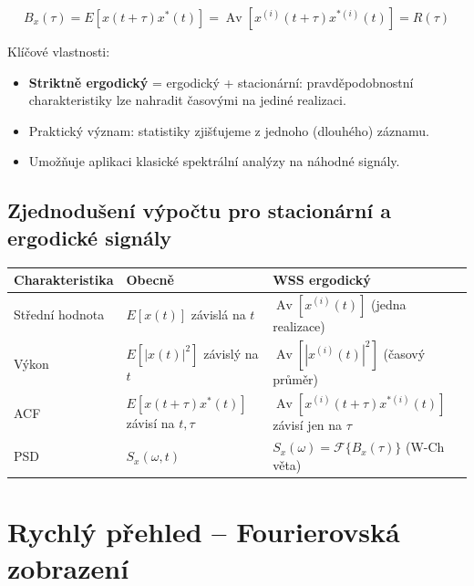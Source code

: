 \documentclass[12pt,a4paper]{article}
\newcommand{\FT}{\mathcal{F}}
\newcommand{\Av}{\operatorname{Av}}
\begin{document}
\begin{matBox}
\[
  B_x(\tau) = E[x(t+\tau)x^*(t)] = \Av[x^{(i)}(t+\tau)x^{*(i)}(t)] = R(\tau)
\]
\end{matBox}

Klíčové vlastnosti:
\begin{itemize}
  \item \textbf{Striktně ergodický} = ergodický + stacionární: pravděpodobnostní charakteristiky lze nahradit časovými na jediné realizaci.
  \item Praktický význam: statistiky zjišťujeme z jednoho (dlouhého) záznamu.
  \item Umožňuje aplikaci klasické spektrální analýzy na náhodné signály.
\end{itemize}

\subsection*{Zjednodušení výpočtu pro stacionární a ergodické signály}

\begin{center}
\begin{tabular}{lll}
\toprule
\textbf{Charakteristika} & \textbf{Obecně} & \textbf{WSS ergodický} \\
\midrule
Střední hodnota & $E[x(t)]$ závislá na $t$ & $\Av[x^{(i)}(t)]$ (jedna realizace) \\
Výkon & $E[|x(t)|^2]$ závislý na $t$ & $\Av[|x^{(i)}(t)|^2]$ (časový průměr) \\
ACF & $E[x(t+\tau)x^*(t)]$ závisí na $t,\tau$ & $\Av[x^{(i)}(t+\tau)x^{*(i)}(t)]$ závisí jen na $\tau$ \\
PSD & $S_x(\omega,t)$ & $S_x(\omega) = \FT\{B_x(\tau)\}$ (W-Ch věta) \\
\bottomrule
\end{tabular}
\end{center}

\newpage
\section*{Rychlý přehled – Fourierovská zobrazení}
\end{document}
